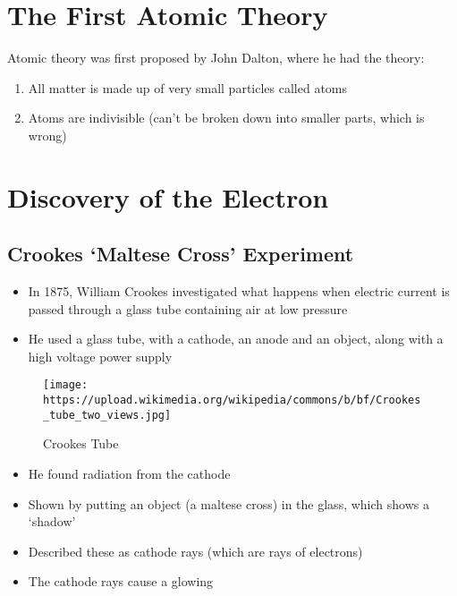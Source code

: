 \hypertarget{the-first-atomic-theory}{%
\section{The First Atomic Theory}\label{the-first-atomic-theory}}

Atomic theory was first proposed by John Dalton, where he had the
theory:

\begin{enumerate}
\def\labelenumi{\arabic{enumi}.}
\tightlist
\item
  All matter is made up of very small particles called atoms
\item
  Atoms are indivisible (can't be broken down into smaller parts, which
  is wrong)
\end{enumerate}

\hypertarget{discovery-of-the-electron}{%
\section{Discovery of the Electron}\label{discovery-of-the-electron}}

\hypertarget{crookes-maltese-cross-experiment}{%
\subsection{Crookes `Maltese Cross'
Experiment}\label{crookes-maltese-cross-experiment}}

\begin{itemize}
\tightlist
\item
  In 1875, William Crookes investigated what happens when electric
  current is passed through a glass tube containing air at low pressure
\item
  He used a glass tube, with a cathode, an anode and an object, along
  with a high voltage power supply
\end{itemize}

\begin{figure}
\centering
\texttt{[image: https://upload.wikimedia.org/wikipedia/commons/b/bf/Crookes\_tube\_two\_views.jpg]}
\caption{Crookes Tube}
\end{figure}

\begin{itemize}
\tightlist
\item
  He found radiation from the cathode
\item
  Shown by putting an object (a maltese cross) in the glass, which shows
  a `shadow'
\item
  Described these as cathode rays (which are rays of electrons)
\item
  The cathode rays cause a glowing
\end{itemize}

